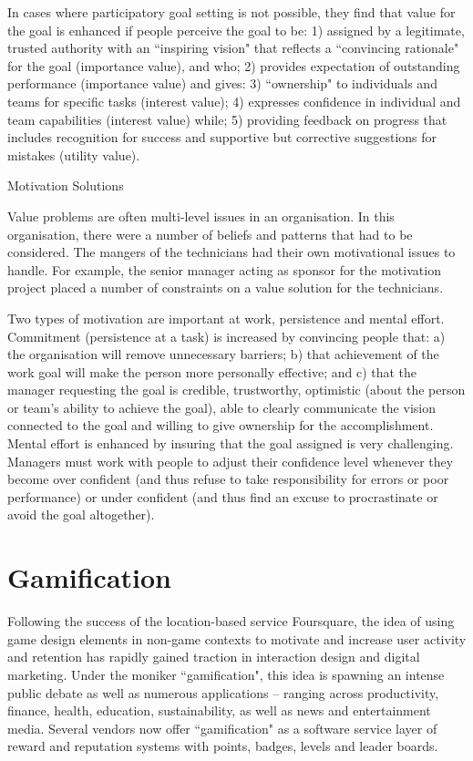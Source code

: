 In cases where participatory goal setting is not possible, they find that value for the goal is enhanced if people perceive the goal to be: 1) assigned by a legitimate, trusted authority with an ``inspiring vision" that reflects a ``convincing rationale" for the goal (importance value), and who; 2) provides expectation of outstanding performance (importance value) and gives: 3) ``ownership" to individuals and teams for specific tasks (interest value); 4) expresses confidence in individual and team capabilities (interest value) while; 5) providing feedback on progress that includes recognition for success and supportive but corrective suggestions for mistakes (utility value).

Motivation Solutions

Value problems are often multi-level issues in an organisation. In this organisation, there were a number of beliefs and patterns that had to be considered. The mangers of the technicians had their own motivational issues to handle. For example, the senior manager acting as sponsor for the motivation project placed a number of constraints on a value solution for the technicians.

Two types of motivation are important at work, persistence and mental effort. Commitment (persistence at a task) is increased by convincing people that: a) the organisation will remove unnecessary barriers; b) that achievement of the work goal will make the person more personally effective; and c) that the manager requesting the goal is credible, trustworthy, optimistic (about the person or team’s ability to achieve the goal), able to clearly communicate the vision connected to the goal and willing to give ownership for the accomplishment. Mental effort is enhanced by insuring that the goal assigned is very challenging. Managers must work with people to adjust their confidence level whenever they become over confident (and thus refuse to take responsibility for errors or poor performance) or under confident (and thus find an excuse to procrastinate or avoid the goal altogether).

\section{Gamification}

Following the success of the location-based service Foursquare, the idea of using game design elements in non-game contexts to motivate and increase user activity and retention has rapidly gained traction in interaction design and digital marketing. Under the moniker ``gamification", this idea is spawning an intense public debate as well as numerous applications – ranging across productivity, finance, health, education, sustainability, as well as news and entertainment media. Several vendors now offer ``gamification" as a software service layer of reward and reputation systems with points, badges, levels and leader boards.

